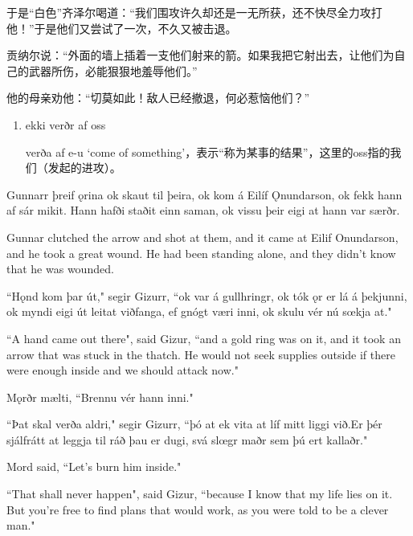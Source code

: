 \begin{translation*}{}
  于是“白色”齐泽尔喝道：“我们围攻许久却还是一无所获，还不快尽全力攻打他！”于是他们又尝试了一次，不久又被击退。

  贡纳尔说：“外面的墙上插着一支他们射来的箭。如果我把它射出去，让他们为自己的武器所伤，必能狠狠地羞辱他们。”

  他的母亲劝他：“切莫如此！敌人已经撤退，何必惹恼他们？”
\end{translation*}
\begin{grammar*}{}
  \begin{enumerate}[leftmargin=*]
    \item ekki verðr af oss

          verða af e-u `come of something'，表示“称为某事的结果”，这里的oss指的我们（发起的进攻）。
  \end{enumerate}
\end{grammar*}
\begin{paracol}{2}
  Gunnarr þreif ǫrina ok skaut til þeira, ok kom á Eilíf Ǫnundarson, ok fekk hann af sár mikit. Hann hafði staðit einn saman, ok vissu þeir eigi at hann var særðr.

  \switchcolumn
  Gunnar clutched the arrow and shot at them, and it came at Eilif Onundarson, and he took a great wound. He had been standing alone, and they didn't know that he was wounded.

  \switchcolumn*

  ``Hǫnd kom þar út," segir Gizurr, ``ok var á gullhringr, ok tók ǫr er lá á þekjunni, ok myndi eigi út leitat viðfanga, ef gnógt væri inni, ok skulu vér nú sœkja at."

  \switchcolumn

  ``A hand came out there", said Gizur, ``and a gold ring was on it, and it took an arrow that was stuck in the thatch. He would not seek supplies outside if there were enough inside and we should attack now."

  \switchcolumn*

  Mǫrðr mælti, ``Brennu vér hann inni."

  ``Þat skal verða aldri," segir Gizurr, ``þó at ek vita at líf mitt liggi við.\footnotemark Er þér sjálfrátt at leggja til ráð þau er dugi, svá slœgr maðr sem þú ert kallaðr."

  \switchcolumn

  Mord said, ``Let's burn him inside."

  ``That shall never happen", said Gizur, ``because I know that my life lies on it. But you're free to find plans that would work, as you were told to be a clever man."
\end{paracol}

